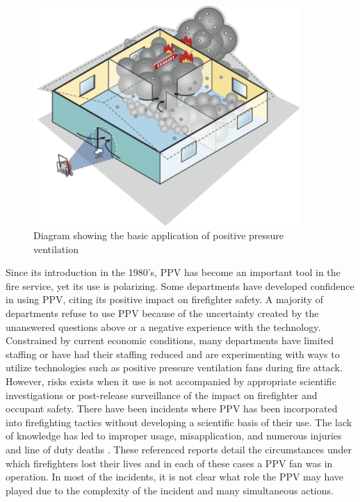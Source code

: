 \documentclass{article}
\begin{document}
\begin{figure}[H]
	\centering
	\includegraphics[width = 4in]{0_Images/Tactical_Considerations/Exhaust_Over_Cone/ppv_illistration.pdf}
	\caption{Diagram showing the basic application of positive pressure ventilation}
	\label{fig:PPV_Diagram}
\end{figure}
 
Since its introduction in the 1980’s, PPV has become an important tool in the fire service, yet its use is polarizing. Some departments have developed confidence in using PPV, citing its positive impact on firefighter safety. A majority of departments refuse to use PPV because of the uncertainty created by the unanswered questions above or a negative experience with the technology. Constrained by current economic conditions, many departments have limited staffing or have had their staffing reduced and are experimenting with ways to utilize technologies such as positive pressure ventilation fans during fire attack. However, risks exists when it use is not accompanied by appropriate scientific investigations or post-release surveillance of the impact on firefighter and occupant safety. There have been incidents where PPV has been incorporated into firefighting tactics without developing a scientific basis of their use. The lack of knowledge has led to improper usage, misapplication, and numerous injuries and line of duty deaths \cite{NIOSHF2000-44} \cite{NIOSH98F-32} \cite{TexasFMFY07-02} \cite{ContraCostaFalaityInvestigation} \cite{NIOSHF2004-02} \cite{NIOSHF2002-12}. These referenced reports detail the circumstances under which firefighters lost their lives and in each of these cases a PPV fan was in operation. In most of the incidents, it is not clear what role the PPV may have played due to the complexity of the incident and many simultaneous actions. 
 
\end{document}
